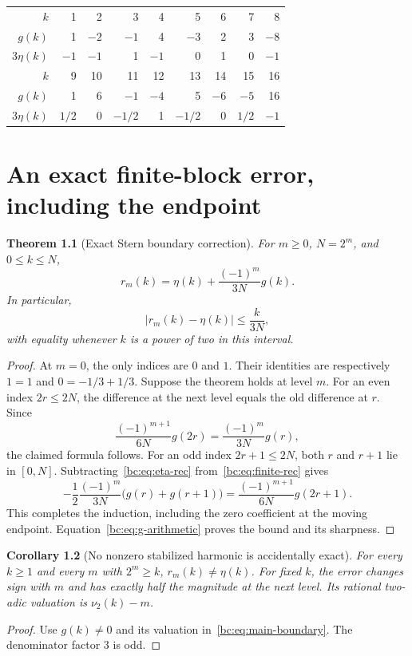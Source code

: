 \documentclass[11pt,a4paper,oneside,openany]{book}
\numberwithin{equation}{chapter}
\newtheorem{theorem}{Theorem}[chapter]
\newtheorem{corollary}[theorem]{Corollary}
\theoremstyle{definition}
\theoremstyle{remark}
\newcommand{\vnu}{\nu_2}
\begin{document}
\begin{center}\small
\begin{tabular}{@{}r*{8}{r}@{}}
\toprule
$k$ & 1&2&3&4&5&6&7&8\\
$g(k)$ &1&$-2$&$-1$&4&$-3$&2&3&$-8$\\
$3\eta(k)$ &$-1$&$-1$&1&$-1$&0&1&0&$-1$\\
\midrule
$k$ &9&10&11&12&13&14&15&16\\
$g(k)$ &1&6&$-1$&$-4$&5&$-6$&$-5$&16\\
$3\eta(k)$ &$1/2$&0&$-1/2$&1&$-1/2$&0&$1/2$&$-1$\\
\bottomrule
\end{tabular}
\end{center}
\chapter{An exact finite-block error, including the endpoint}
\label{bc:sec:boundary}

\begin{theorem}[Exact Stern boundary correction]
\label{bc:thm:boundary}
For $m\ge0$, $N=2^m$, and $0\le k\le N$,
\begin{equation}
 \boxed{\quad r_m(k)=\eta(k)+\frac{(-1)^m}{3N}g(k).\quad}
 \label{bc:eq:main-boundary}
\end{equation}
In particular,
\begin{equation}
 |r_m(k)-\eta(k)|\le\frac{k}{3N},
 \label{bc:eq:sharp-mode-bound}
\end{equation}
with equality whenever $k$ is a power of two in this interval.
\end{theorem}
\begin{proof}
At $m=0$, the only indices are $0$ and $1$. Their identities are respectively
$1=1$ and $0=-1/3+1/3$. Suppose the theorem holds at level $m$.
For an even index $2r\le2N$, the difference at the next level equals the old
difference at $r$. Since
\[
 \frac{(-1)^{m+1}}{6N}g(2r)
 =\frac{(-1)^m}{3N}g(r),
\]
the claimed formula follows. For an odd index $2r+1\le2N$, both $r$ and $r+1$
lie in $[0,N]$. Subtracting~\eqref{bc:eq:eta-rec} from~\eqref{bc:eq:finite-rec} gives
\[
 -\frac12\frac{(-1)^m}{3N}\bigl(g(r)+g(r+1)\bigr)
 =\frac{(-1)^{m+1}}{6N}g(2r+1).
\]
This completes the induction, including the zero coefficient at the moving
endpoint. Equation~\eqref{bc:eq:g-arithmetic} proves the bound and its sharpness.
\end{proof}

\begin{corollary}[No nonzero stabilized harmonic is accidentally exact]
For every $k\ge1$ and every $m$ with $2^m\ge k$, $r_m(k)\ne\eta(k)$.
For fixed $k$, the error changes sign with $m$ and has exactly half the magnitude
at the next level. Its rational two-adic valuation is $\vnu(k)-m$.
\end{corollary}
\begin{proof}
Use $g(k)\ne0$ and its valuation in~\eqref{bc:eq:main-boundary}. The denominator
factor $3$ is odd.
\end{proof}
\end{document}
